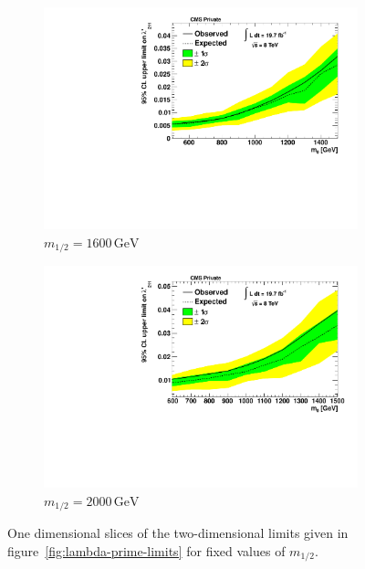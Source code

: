 \begin{figure}[!p]
  \begin{subfigure}[b]{0.495\textwidth}
    \centering
    \includegraphics[width=\textwidth]{plots/limit_m12_1600.pdf}
    \caption{$m_{1/2} = 1600\,\text{GeV}$\label{fig:limit-m12-1600}}
  \end{subfigure}
  \begin{subfigure}[b]{0.495\textwidth}
    \centering
    \includegraphics[width=\textwidth]{plots/limit_m12_2000.pdf}
    \caption{$m_{1/2} = 2000\,\text{GeV}$\label{fig:limit-m12-2000}}
  \end{subfigure}

  \caption{One dimensional slices of the two-dimensional limits given in figure~\ref{fig:lambda-prime-limits} for fixed values of $m_{1/2}$.}
  \label{fig:1d-limits}
\end{figure}


